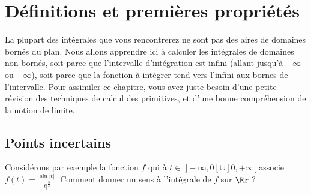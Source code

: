 \documentclass[class=report,crop=false]{standalone}
\begin{document}








\section{Définitions et premières propriétés}


La plupart des intégrales que vous rencontrerez ne sont pas des
aires de domaines bornés du plan. Nous allons apprendre ici à
calculer les intégrales de domaines non bornés, 
soit parce que
l'intervalle d'intégration est infini (allant jusqu'à $+\infty$ ou $-\infty$), 
soit parce que la fonction à intégrer tend vers l'infini aux bornes de
l'intervalle. Pour assimiler ce chapitre, vous avez juste besoin d'une
petite révision des techniques de calcul des primitives, et d'une
bonne compréhension de la notion de limite.

\subsection{Points incertains}



Considérons par exemple la fonction $f$ qui à
$t\in\;]-\infty,0[\cup]0,+\infty[$ associe $f(t) = \frac{\sin |t|}{|t|^{\frac32}}$.
Comment donner un sens à l'intégrale de $f$ sur $\Rr$ ?

\end{document}
